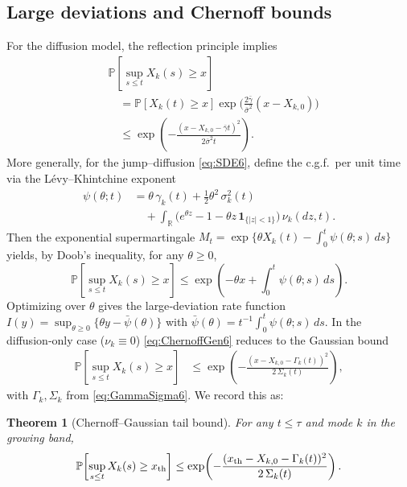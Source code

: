 \documentclass[aps,pre,twocolumn,showpacs,superscriptaddress]{revtex4-2}
\newtheorem{theorem}{Theorem}
\theoremstyle{definition}
\newcommand{\RR}{\mathbb{R}}
\newcommand{\PP}{\mathbb{P}}
\begin{document}
\subsection{Large deviations and Chernoff bounds}\label{subsec:LD6}

For the diffusion model, the reflection principle implies
\begin{align}
&\PP\!\left[\sup_{s\le t} X_k(s)\ge x\right]\nonumber\\
&\quad=\PP\!\left[X_k(t)\ge x\right]\exp\!\Big(\tfrac{2\bar\gamma}{\bar\sigma^2}(x-X_{k,0})\Big)\nonumber\\
&\quad\le \exp\!\left(-\frac{(x-X_{k,0}-\bar\gamma t)^2}{2\bar\sigma^2 t}\right).
\end{align}
More generally, for the jump–diffusion \eqref{eq:SDE6}, define the c.g.f.\ per unit time via the L\'evy–Khintchine exponent
\begin{align}\label{eq:psi6}
\psi(\theta;t) &= \theta\,\gamma_k(t) + \tfrac{1}{2}\theta^2\,\sigma_k^2(t)\nonumber\\
&\quad+ \int_{\RR}\!\big(e^{\theta z}-1-\theta z\,\mathbf{1}_{\{|z|<1\}}\big)\,\nu_k(dz,t).
\end{align}
Then the exponential supermartingale $M_t=\exp\{\theta X_k(t)-\int_0^t\psi(\theta;s)\,ds\}$ yields, by Doob’s inequality, for any $\theta\ge 0$,
\begin{equation}\label{eq:ChernoffGen6}
\PP\!\left[\sup_{s\le t} X_k(s)\ge x\right] \le \exp\!\left(-\theta x + \int_0^t \psi(\theta;s)\,ds\right).
\end{equation}
Optimizing over $\theta$ gives the large‑deviation rate function $I(y)=\sup_{\theta\ge 0}\{\theta y - \bar\psi(\theta)\}$ with $\bar\psi(\theta)=t^{-1}\!\int_0^t\psi(\theta;s)\,ds$. In the diffusion‑only case ($\nu_k\equiv 0$) \eqref{eq:ChernoffGen6} reduces to the Gaussian bound
\begin{align}\label{eq:ChernoffGauss6}
\PP\!\left[\sup_{s\le t} X_k(s)\ge x\right]&\le \exp\!\left(-\frac{(x-X_{k,0}-\Gamma_k(t))^2}{2\,\Sigma_k(t)}\right),
\end{align}
with $\Gamma_k,\Sigma_k$ from \eqref{eq:GammaSigma6}. We record this as:

\begin{theorem}[Chernoff–Gaussian tail bound]\label{thm:chernoff6}
For any $t\le \tau$ and mode $k$ in the growing band,
\[
\PP\!\left[\sup_{s\le t} X_k(s)\ge x_{\rm th}\right]
\le \exp\!\left(-\frac{(x_{\rm th}-X_{k,0}-\Gamma_k(t))^2}{2\,\Sigma_k(t)}\right).
\]
\end{theorem}
\end{document}
